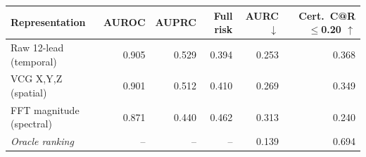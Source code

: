 \caption{Overall predictive and selective performance across four held-out sources. AURC is the primary selective metric; Cert.\ C@R$\leq$0.20 is the coverage retained at a certified selective Jaccard risk ($\delta=0.05$), averaged over the four leave-one-source-out experiments. The oracle row orders records by their realised loss: it is the best any confidence score could achieve on these predictions, and is neither a certified coverage nor a statistical bound.}
\begin{tabular}{lrrrrr}
\toprule
Representation & AUROC & AUPRC & Full risk & AURC $\downarrow$ & Cert.\ C@R$\leq$0.20 $\uparrow$ \\
\midrule
Raw 12-lead (temporal) & 0.905 & 0.529 & 0.394 & 0.253 & 0.368 \\
VCG X,Y,Z (spatial) & 0.901 & 0.512 & 0.410 & 0.269 & 0.349 \\
FFT magnitude (spectral) & 0.871 & 0.440 & 0.462 & 0.313 & 0.240 \\
\midrule
\textit{Oracle ranking} & -- & -- & -- & 0.139 & 0.694 \\
\bottomrule
\end{tabular}
